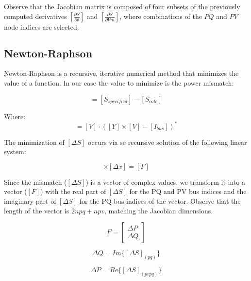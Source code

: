 \documentclass[nols,a4paper,twoside,notoc,fleqn]{tufte-book}
\begin{document}
Observe that the Jacobian matrix is composed of four subsets of the previously computed derivatives $\left[\frac{\partial S}{\partial \theta}\right]$ and $\left[\frac{\partial S}{\partial Vm}\right]$, where combinations of the $PQ$ and $PV$ node indices are selected.


\newpage
\subsection{Newton-Raphson}

Newton-Raphson is a recursive, iterative numerical method that minimizes the value of a function. In our case the value to minimize is the power mismatch:

\begin{equation}
[\Delta S] = [S_{specified}] - [S_{calc} ]
\end{equation}

Where:
\begin{equation}
[S_{calc}] = [V] \cdot ([Y] \times [V] - [I_{bus}])^*
\label{eq:nr_Scalc}
\end{equation}

The minimization of $[\Delta S]$ occurs via se recursive solution of the following linear system:

\begin{equation}
[J] \times [\Delta x] = [F]
\end{equation}

Since the mismatch ($[\Delta S]$) is a vector of complex values, we transform it into a vector ($[F]$) with the real part of $[\Delta S]$ for the PQ and PV bus indices and the imaginary part of $[\Delta S]$ for the PQ bus indices of the vector. Observe that the length of the vector is $2npq+npv$, matching the Jacobian dimensions.



\begin{equation}
F =  \left[
\begin{array}{c}
\Delta P \\
\Delta Q  
\end{array}
\right]
\label{eq:nr_mismatch}
\end{equation}

\begin{equation}
\Delta Q = Im \{ [\Delta S]_{(pq)} \}
\label{eq:nr_q_inc}
\end{equation}

\begin{equation}
\Delta P = Re \{ [\Delta S]_{(pvpq)}  \} 
\label{eq:nr_p_inc}
\end{equation}
\end{document}
